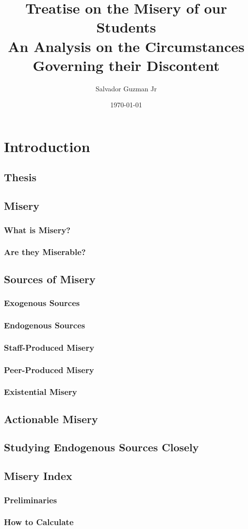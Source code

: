 \documentclass[UTF8]{article}
\title{%
	Treatise on the Misery of our Students\\
	\large An Analysis on the Circumstances Governing their Discontent
}
\author{Salvador Guzman Jr}
\date{\today}
\begin{document}
	\maketitle
	\newpage
	\tableofcontents
	\newpage
	
	\section{Introduction}
	\subsection{Thesis}
	\subsection{Misery}
	\subsubsection{What is Misery?}
	\subsubsection{Are they Miserable?}

	\subsection{Sources of Misery}
	\subsubsection{Exogenous Sources}
	\subsubsection{Endogenous Sources}
	\subsubsection{Staff-Produced Misery}
	\subsubsection{Peer-Produced Misery}
	\subsubsection{Existential Misery}

	\subsection{Actionable Misery}
	\subsection{Studying Endogenous Sources Closely}
	\subsection{Misery Index}
	\subsubsection{Preliminaries}
	\subsubsection{How to Calculate}
\end{document}
